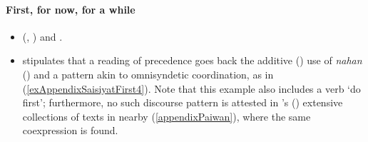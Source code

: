 \paragraph{First, for now, for a while}\label{appendixSaisiyatFirst}
\begin{itemize}
	\item \citeauthor{Huang2007} (\citeyear{Huang2007}, \citeyear[116–120]{Huang2008}) and \textcite[154]{ZeitounEtal2015}.
	\item \textcite{Huang2008} stipulates that a reading of precedence goes back the additive () use of \textit{nahan} () and a pattern akin to omnisyndetic coordination, as in (\ref{exAppendixSaisiyatFirst4}). Note that this example also includes a verb \lq do first'; furthermore, no such discourse pattern is attested in \citeauthor{EarlyWhitehorn2003}'s (\citeyear{EarlyWhitehorn2003}) extensive collections of texts in nearby  (\ref{appendixPaiwan}), where the same coexpression is found.
\end{itemize}
	
